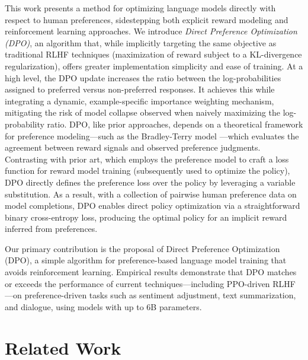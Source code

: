 This work presents a method for optimizing language models directly with respect to human preferences, sidestepping both explicit reward modeling and reinforcement learning approaches. We introduce \textit{Direct Preference Optimization (DPO)}, an algorithm that, while implicitly targeting the same objective as traditional RLHF techniques (maximization of reward subject to a KL-divergence regularization), offers greater implementation simplicity and ease of training. At a high level, the DPO update increases the ratio between the log-probabilities assigned to preferred versus non-preferred responses. It achieves this while integrating a dynamic, example-specific importance weighting mechanism, mitigating the risk of model collapse observed when naively maximizing the log-probability ratio. DPO, like prior approaches, depends on a theoretical framework for preference modeling—such as the Bradley-Terry model \cite{bradley1952rankanalysis}—which evaluates the agreement between reward signals and observed preference judgments. Contrasting with prior art, which employs the preference model to craft a loss function for reward model training (subsequently used to optimize the policy), DPO directly defines the preference loss over the policy by leveraging a variable substitution. As a result, with a collection of pairwise human preference data on model completions, DPO enables direct policy optimization via a straightforward binary cross-entropy loss, producing the optimal policy for an implicit reward inferred from preferences.

Our primary contribution is the proposal of Direct Preference Optimization (DPO), a simple algorithm for preference-based language model training that avoids reinforcement learning. Empirical results demonstrate that DPO matches or exceeds the performance of current techniques—including PPO-driven RLHF—on preference-driven tasks such as sentiment adjustment, text summarization, and dialogue, using models with up to 6B parameters.

\section{Related Work}

